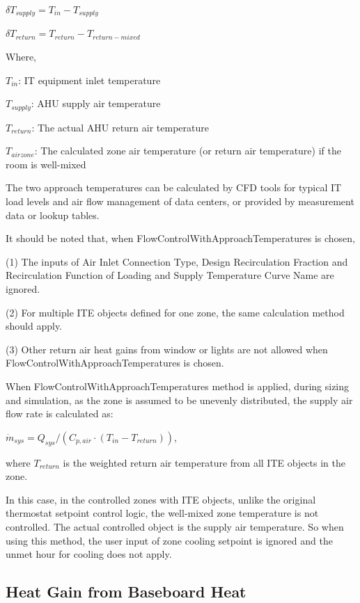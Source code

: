 $\delta T_{supply}=T_{in}-T_{supply}$

$\delta T_{return}=T_{return}-T_{return-mixed}$

Where, 

$T_{in}$: IT equipment inlet temperature

$T_{supply}$: AHU supply air temperature

$T_{return}$: The actual AHU return air temperature

$T_{airzone}$: The calculated zone air temperature (or return air temperature) if the room is well-mixed

The two approach temperatures can be calculated by CFD tools for typical IT load levels and air flow management of data centers, or provided by measurement data or lookup tables. 

It should be noted that, when FlowControlWithApproachTemperatures is chosen, 

(1) The inputs of Air Inlet Connection Type, Design Recirculation Fraction and Recirculation Function of Loading and Supply Temperature Curve Name are ignored.

(2) For multiple ITE objects defined for one zone, the same calculation method should apply. 

(3) Other return air heat gains from window or lights are not allowed when FlowControlWithApproachTemperatures is chosen.

When FlowControlWithApproachTemperatures method is applied, during sizing and simulation, as the zone is assumed to be unevenly distributed, the supply air flow rate is calculated as:

${\dot m_{sys}} = {Q_{sys}}/({C_{p,air}} \cdot ({T_{in}} - {T_{return}}))$,

where $T_{return}$ is the weighted return air temperature from all ITE objects in the zone. 

In this case, in the controlled zones with ITE objects, unlike the original thermostat setpoint control logic, the well-mixed zone temperature is not controlled. The actual controlled object is the supply air temperature. So when using this method, the user input of zone cooling setpoint is ignored and the unmet hour for cooling does not apply.

\subsection{Heat Gain from Baseboard Heat}\label{heat-gain-from-baseboard-heat}

